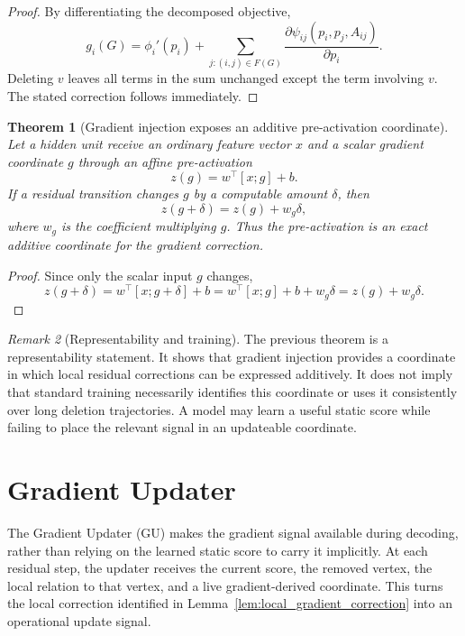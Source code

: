 \documentclass[11pt]{article}
\theoremstyle{plain}
\newtheorem{theorem}{Theorem}[section]
\theoremstyle{remark}
\newtheorem{remark}[theorem]{Remark}
\begin{document}
\begin{proof}
  By differentiating the decomposed objective,
  \[
    g_i(G)=\phi_i'(p_i)+
    \sum_{j:(i,j)\in F(G)}
    \frac{\partial \psi_{ij}(p_i,p_j,A_{ij})}{\partial p_i}.
  \]
  Deleting $v$ leaves all terms in the sum unchanged except the term involving
  $v$.  The stated correction follows immediately.
\end{proof}

\begin{theorem}[Gradient injection exposes an additive pre-activation coordinate]
  \label{thm:additive_coordinate}
  Let a hidden unit receive an ordinary feature vector $x$ and a scalar gradient
  coordinate $g$ through an affine pre-activation
  \[
    z(g)=w^\top[x;g]+b.
  \]
  If a residual transition changes $g$ by a computable amount $\delta$, then
  \[
    z(g+\delta)=z(g)+w_g\delta,
  \]
  where $w_g$ is the coefficient multiplying $g$.  Thus the pre-activation is
  an exact additive coordinate for the gradient correction.
\end{theorem}

\begin{proof}
  Since only the scalar input $g$ changes,
  \[
    z(g+\delta)=w^\top[x;g+\delta]+b
    =w^\top[x;g]+b+w_g\delta
    =z(g)+w_g\delta.
  \]
\end{proof}

\begin{remark}[Representability and training]
  The previous theorem is a representability statement.  It shows that gradient
  injection provides a coordinate in which local residual corrections can be
  expressed additively.  It does not imply that standard training necessarily
  identifies this coordinate or uses it consistently over long deletion
  trajectories.  A model may learn a useful static score while failing to place
  the relevant signal in an updateable coordinate.
\end{remark}

\section{Gradient Updater}

The Gradient Updater (GU) makes the gradient signal available during decoding,
rather than relying on the learned static score to carry it implicitly.  At each
residual step, the updater receives the current score, the removed vertex, the
local relation to that vertex, and a live gradient-derived coordinate.  This
turns the local correction identified in Lemma~\ref{lem:local_gradient_correction}
into an operational update signal.
\end{document}
